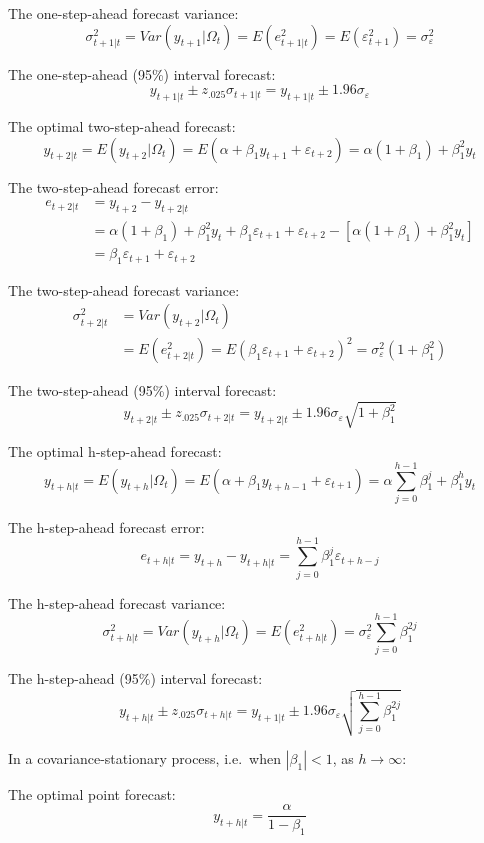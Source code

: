 \documentclass[
  oneside]{book}
\begin{document}
The one-step-ahead forecast variance: \[\sigma_{t+1|t}^2 = Var(y_{t+1}|\Omega_t) = E(e_{t+1|t}^2) = E(\varepsilon_{t+1}^2) = \sigma_{\varepsilon}^2\]

The one-step-ahead (95\%) interval forecast: \[y_{t+1|t} \pm z_{.025}\sigma_{t+1|t} = y_{t+1|t} \pm 1.96\sigma_{\varepsilon}\]

The optimal two-step-ahead forecast: \[y_{t+2|t} = E(y_{t+2}|\Omega_t) = E(\alpha + \beta_1 y_{t+1} + \varepsilon_{t+2}) = \alpha(1+\beta_1) + \beta_1^2 y_t\]

The two-step-ahead forecast error:
\[\begin{aligned}
e_{t+2|t} &= y_{t+2} - y_{t+2|t} \\
&= \alpha(1+\beta_1) + \beta_1^2 y_t + \beta_1\varepsilon_{t+1} + \varepsilon_{t+2} - [\alpha(1+\beta_1) + \beta_1^2 y_t] \\
&= \beta_1\varepsilon_{t+1} + \varepsilon_{t+2}
\end{aligned}\]

The two-step-ahead forecast variance:
\[\begin{aligned}
\sigma_{t+2|t}^2 &= Var(y_{t+2}|\Omega_t) \\
&= E(e_{t+2|t}^2) = E(\beta_1\varepsilon_{t+1} + \varepsilon_{t+2})^2 = \sigma_{\varepsilon}^2(1+\beta_1^2)
\end{aligned}\]

The two-step-ahead (95\%) interval forecast: \[y_{t+2|t} \pm z_{.025}\sigma_{t+2|t} = y_{t+2|t} \pm 1.96\sigma_{\varepsilon}\sqrt{1+\beta_1^2}\]

The optimal h-step-ahead forecast: \[y_{t+h|t} = E(y_{t+h}|\Omega_t) = E(\alpha + \beta_1 y_{t+h-1} + \varepsilon_{t+1}) = \alpha\textstyle\sum_{j=0}^{h-1}\beta_1^j + \beta_1^h y_t\]

The h-step-ahead forecast error: \[e_{t+h|t} = y_{t+h} - y_{t+h|t} = \textstyle\sum_{j=0}^{h-1}\beta_1^j\varepsilon_{t+h-j}\]

The h-step-ahead forecast variance: \[\sigma_{t+h|t}^2 = Var(y_{t+h}|\Omega_t) = E(e_{t+h|t}^2) = \sigma_{\varepsilon}^2\textstyle\sum_{j=0}^{h-1}\beta_1^{2j}\]

The h-step-ahead (95\%) interval forecast: \[y_{t+h|t} \pm z_{.025}\sigma_{t+h|t} = y_{t+1|t} \pm 1.96\sigma_{\varepsilon}\sqrt{\textstyle\sum_{j=0}^{h-1}\beta_1^{2j}}\]

In a covariance-stationary process, i.e.~when \(|\beta_1| < 1\), as \(h \to \infty\):

The optimal point forecast: \[y_{t+h|t} = \frac{\alpha}{1-\beta_1}\]
\end{document}
